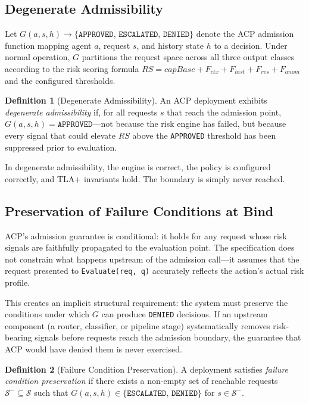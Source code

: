\documentclass[11pt]{article}
\theoremstyle{definition}
\newtheorem{definition}{Definition}
\begin{document}
\subsection{Degenerate Admissibility}

Let $G(a, s, h) \to \{\texttt{APPROVED},\,\texttt{ESCALATED},\,\texttt{DENIED}\}$
denote the ACP admission function mapping agent $a$, request $s$, and
history state $h$ to a decision.
Under normal operation, $G$ partitions the request space across all three
output classes according to the risk scoring formula
$\mathit{RS} = \mathit{capBase} + F_{\mathit{ctx}} + F_{\mathit{hist}} + F_{\mathit{res}} + F_{\mathit{anom}}$
and the configured thresholds.

\begin{definition}[Degenerate Admissibility]
An ACP deployment exhibits \emph{degenerate admissibility} if, for all requests
$s$ that reach the admission point, $G(a, s, h) = \texttt{APPROVED}$---not
because the risk engine has failed, but because every signal that could elevate
$\mathit{RS}$ above the \texttt{APPROVED} threshold has been suppressed prior to
evaluation.
\end{definition}

In degenerate admissibility, the engine is correct, the policy is configured
correctly, and TLA+ invariants hold. The boundary is simply never reached.

\subsection{Preservation of Failure Conditions at Bind}

ACP's admission guarantee is conditional: it holds for any request whose
risk signals are faithfully propagated to the evaluation point.
The specification does not constrain what happens upstream of the admission
call---it assumes that the request presented to \texttt{Evaluate(req,\,q)}
accurately reflects the action's actual risk profile.

This creates an implicit structural requirement: the system must preserve the
conditions under which $G$ can produce \texttt{DENIED} decisions.
If an upstream component (a router, classifier, or pipeline stage) systematically
removes risk-bearing signals before requests reach the admission boundary,
the guarantee that ACP would have denied them is never exercised.

\begin{definition}[Failure Condition Preservation]
A deployment satisfies \emph{failure condition preservation} if there exists a
non-empty set of reachable requests $\mathcal{S}^- \subseteq \mathcal{S}$ such that
$G(a, s, h) \in \{\texttt{ESCALATED},\,\texttt{DENIED}\}$ for $s \in \mathcal{S}^-$.
\end{definition}
\end{document}
